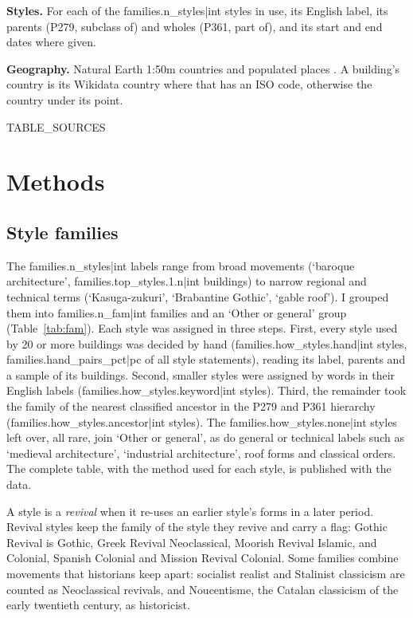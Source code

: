\documentclass[11pt,a4paper]{article}
\begin{document}
\textbf{Styles.} For each of the {{families.n_styles|int}} styles in use, its English label, its parents (P279, subclass of) and wholes (P361, part of), and its start and end dates where given.

\textbf{Geography.} Natural Earth 1:50m countries and populated places \citep{naturalearth}. A building's country is its Wikidata country where that has an ISO code, otherwise the country under its point.

{{TABLE_SOURCES}}

\section{Methods}
\subsection{Style families}
The {{families.n_styles|int}} labels range from broad movements (`baroque architecture', {{families.top_styles.1.n|int}} buildings) to narrow regional and technical terms (`Kasuga-zukuri', `Brabantine Gothic', `gable roof'). I grouped them into {{families.n_fam|int}} families and an `Other or general' group (Table~\ref{tab:fam}). Each style was assigned in three steps. First, every style used by 20 or more buildings was decided by hand ({{families.how_styles.hand|int}} styles, {{families.hand_pairs_pct|pc}} of all style statements), reading its label, parents and a sample of its buildings. Second, smaller styles were assigned by words in their English labels ({{families.how_styles.keyword|int}} styles). Third, the remainder took the family of the nearest classified ancestor in the P279 and P361 hierarchy ({{families.how_styles.ancestor|int}} styles). The {{families.how_styles.none|int}} styles left over, all rare, join `Other or general', as do general or technical labels such as `medieval architecture', `industrial architecture', roof forms and classical orders. The complete table, with the method used for each style, is published with the data.

A style is a \emph{revival} when it re-uses an earlier style's forms in a later period. Revival styles keep the family of the style they revive and carry a flag: Gothic Revival is Gothic, Greek Revival Neoclassical, Moorish Revival Islamic, and Colonial, Spanish Colonial and Mission Revival Colonial. Some families combine movements that historians keep apart: socialist realist and Stalinist classicism are counted as Neoclassical revivals, and Noucentisme, the Catalan classicism of the early twentieth century, as historicist.
\end{document}

